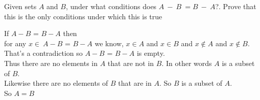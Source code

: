 \documentclass[12pt]{article}
\newenvironment{solution}[2][Solution]{ \begin{trivlist}
\item[\hskip \labelsep {\bfseries #1}]}{\end{trivlist}}
\newenvironment{problem}[2][Problem]{\begin{trivlist}
\item[\hskip \labelsep {\bfseries #1}\hskip \labelsep {\bfseries #2.}]}{\end{trivlist}}
\begin{document}
\vskip 0.5in

\begin{problem}{2}
Given sets $A$ and $B$, under what conditions does $A\ -\ B\ = B\ -\ A$?. Prove that this is the only conditions under which this is true
\end{problem}
\begin{solution}{2}
\item[]
If $A - B$ = $B - A$ then \\ for any $x\in\ A - B$ = $B - A$ we know, $x \in A$ and $x \in B$ and $x\notin A$ and $x\notin B$.\\ That's a contradiction so $A - B$ = $B - A$ is empty.
\\
Thus there are no elements in $A$ that are not in $B$. In other words $A$ is a subset of $B$. \\ Likewise there are no elements of $B$ that are in $A$. So $B$ is a subset of $A$.
\\
\indent So $A=B$
\end{solution}

\pagebreak
\end{document}
